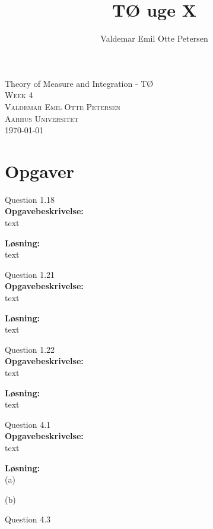 \documentclass{article}
\author{Valdemar Emil Otte Petersen}
\title{TØ uge X}
\begin{document}
\begingroup

\centering 
{\LARGE Theory of Measure and Integration - TØ}\\ %
\vspace*{1\baselineskip}
\scshape
Week 4\\
Valdemar Emil Otte Petersen\\ %
{\small Aarhus Universitet}\\ 
{\small \today}

\endgroup

\section{Opgaver}
{\LARGE Question 1.18}\\

\textbf{Opgavebeskrivelse:}\\
text

\vspace{15px}
\textbf{Løsning:}\\
text


\vspace{35px}
{\LARGE Question 1.21}\\

\textbf{Opgavebeskrivelse:}\\
text

\vspace{15px}
\textbf{Løsning:}\\
text

\vspace{35px}
{\LARGE Question 1.22}\\

\textbf{Opgavebeskrivelse:}\\
text

\vspace{15px}
\textbf{Løsning:}\\
text

\vspace{35px}
{\LARGE Question 4.1}\\

\textbf{Opgavebeskrivelse:}\\
text

\vspace{15px}
\textbf{Løsning:}\\
(a)

(b)

\vspace{35px}
{\LARGE Question 4.3}\\
\end{document}
